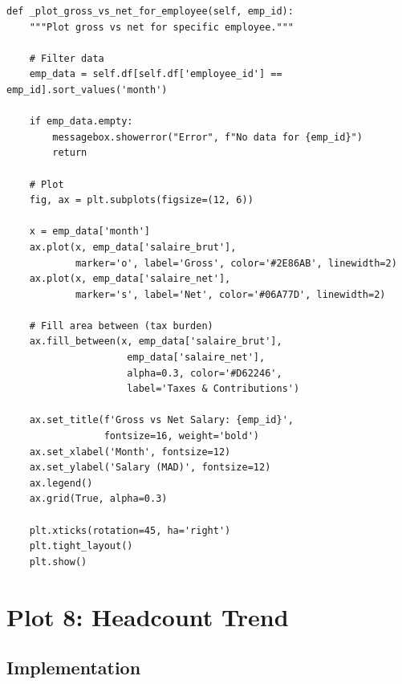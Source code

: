 \begin{lstlisting}[style=pythonstyle]
def _plot_gross_vs_net_for_employee(self, emp_id):
    """Plot gross vs net for specific employee."""
    
    # Filter data
    emp_data = self.df[self.df['employee_id'] == emp_id].sort_values('month')
    
    if emp_data.empty:
        messagebox.showerror("Error", f"No data for {emp_id}")
        return
    
    # Plot
    fig, ax = plt.subplots(figsize=(12, 6))
    
    x = emp_data['month']
    ax.plot(x, emp_data['salaire_brut'], 
            marker='o', label='Gross', color='#2E86AB', linewidth=2)
    ax.plot(x, emp_data['salaire_net'],
            marker='s', label='Net', color='#06A77D', linewidth=2)
    
    # Fill area between (tax burden)
    ax.fill_between(x, emp_data['salaire_brut'],
                     emp_data['salaire_net'],
                     alpha=0.3, color='#D62246',
                     label='Taxes & Contributions')
    
    ax.set_title(f'Gross vs Net Salary: {emp_id}',
                 fontsize=16, weight='bold')
    ax.set_xlabel('Month', fontsize=12)
    ax.set_ylabel('Salary (MAD)', fontsize=12)
    ax.legend()
    ax.grid(True, alpha=0.3)
    
    plt.xticks(rotation=45, ha='right')
    plt.tight_layout()
    plt.show()
\end{lstlisting}

\section{Plot 8: Headcount Trend}

\subsection{Implementation}

